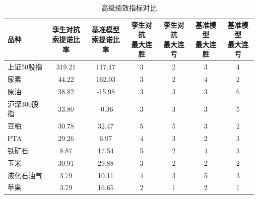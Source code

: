 \FloatBarrier

\begin{table}[!htbp]
\centering
\caption{高级绩效指标对比}
\label{tab:twinadvancedMetrics_new}
\small
\setlength{\tabcolsep}{5pt}
\renewcommand{\arraystretch}{1.18}
\begin{tabular}{lcccccc}
\toprule
\textbf{品种} & \makecell{\textbf{孪生对抗}\\\textbf{索提诺比率}} & \makecell{\textbf{基准模型}\\\textbf{索提诺比率}} & \makecell{\textbf{孪生对抗}\\\textbf{最大连胜}} & \makecell{\textbf{孪生对抗}\\\textbf{最大连亏}} & \makecell{\textbf{基准模型}\\\textbf{最大连胜}} & \makecell{\textbf{基准模型}\\\textbf{最大连亏}} \\
\midrule
上证50股指 & 319.21 & 117.17 & 3 & 2 & 3 & 4 \\
尿素 & 44.22 & 162.03 & 3 & 2 & 4 & 2 \\
原油 & 38.82 & -15.98 & 3 & 3 & 3 & 6 \\
沪深300股指 & 33.80 & -0.36 & 3 & 3 & 3 & 5 \\
豆粕 & 30.78 & 32.47 & 5 & 5 & 3 & 2 \\
PTA & 29.26 & 6.97 & 4 & 3 & 2 & 3 \\
铁矿石 & 8.87 & 17.54 & 5 & 2 & 4 & 3 \\
玉米 & 30.91 & 29.88 & 3 & 2 & 2 & 2 \\
液化石油气 & 3.79 & 10.11 & 4 & 3 & 5 & 3 \\
苹果 & 3.79 & 16.65 & 2 & 1 & 2 & 1 \\
\bottomrule
\end{tabular}
\end{table}
